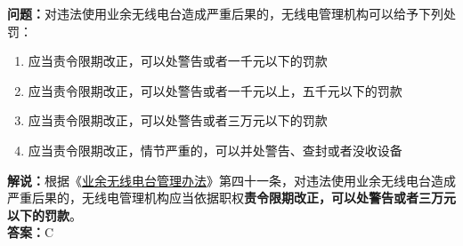 \textbf{问题：}对违法使用业余无线电台造成严重后果的，无线电管理机构可以给予下列处罚：
\begin{enumerate}[label=\Alph*), leftmargin=1cm]
  \item 应当责令限期改正，可以处警告或者一千元以下的罚款
  \item 应当责令限期改正，可以处警告或者一千元以上，五千元以下的罚款
  \item 应当责令限期改正，可以处警告或者三万元以下的罚款
  \item 应当责令限期改正，情节严重的，可以并处警告、查封或者没收设备
\end{enumerate}
\textbf{解说：}根据《\href{https://www.miit.gov.cn/jgsj/zfs/bmgz/art/2020/art_147b69815b3641caad9047735f94c860.html}{业余无线电台管理办法}》第四十一条，对违法使用业余无线电台造成严重后果的，无线电管理机构应当依据职权\textbf{责令限期改正，可以处警告或者三万元以下的罚款}。\\
\textbf{答案：}C

